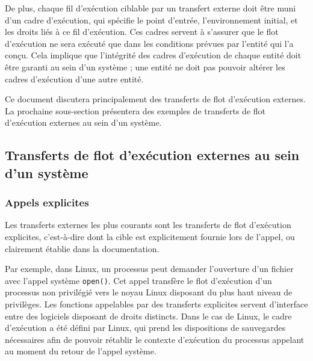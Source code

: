 			De plus, chaque fil d'exécution ciblable par un transfert externe doit être muni d'un cadre d'exécution, qui spécifie le point d'entrée, l'environnement initial, et les droits liés à ce fil d'exécution. Ces cadres servent à s'assurer que le flot d'exécution ne sera exécuté que dans les conditions prévues par l'entité qui l'a conçu. Cela implique que l'intégrité des cadres d'exécution de chaque entité doit être garanti au sein d'un système ; une entité ne doit pas pouvoir altérer les cadres d'exécution d'une autre entité.

			Ce document discutera principalement des transferts de flot d'exécution externes. La prochaine sous-section présentera des exemples de transferts de flot d'exécution externes au sein d'un système. 

		\subsection{Transferts de flot d'exécution externes au sein d'un système}

			\subsubsection{Appels explicites}
			Les transferts externes les plus courants sont les transferts de flot d'exécution explicites, c'est-à-dire dont la cible est explicitement fournie lors de l’appel, ou clairement établie dans la documentation.

Par exemple, dans Linux, un processus peut demander l’ouverture d’un fichier avec l’appel système \texttt{open()}. Cet appel transfère le flot d’exécution d’un processus non privilégié vers le noyau Linux disposant du plus haut niveau de privilèges. Les fonctions appelables par des transferts explicites servent d’interface entre des logiciels disposant de droits distincts. Dans le cas de Linux, le cadre d'exécution a été défini par Linux, qui prend les dispositions de sauvegardes nécessaires afin de pouvoir rétablir le contexte d'exécution du processus appelant au moment du retour de l'appel système.

